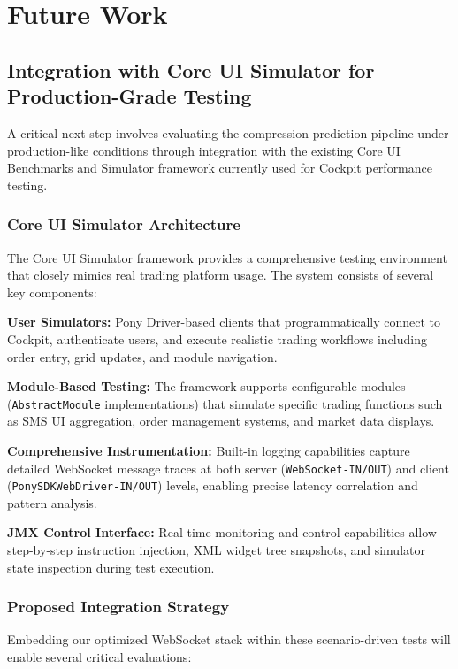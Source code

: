 \documentclass[12pt,a4paper]{article}
\begin{document}
\section{Future Work}

\subsection{Integration with Core UI Simulator for Production-Grade Testing}

A critical next step involves evaluating the compression-prediction pipeline under production-like conditions through integration with the existing Core UI Benchmarks and Simulator framework currently used for Cockpit performance testing.

\subsubsection{Core UI Simulator Architecture}

The Core UI Simulator framework provides a comprehensive testing environment that closely mimics real trading platform usage. The system consists of several key components:

\textbf{User Simulators:} Pony Driver-based clients that programmatically connect to Cockpit, authenticate users, and execute realistic trading workflows including order entry, grid updates, and module navigation.

\textbf{Module-Based Testing:} The framework supports configurable modules (\texttt{AbstractModule} implementations) that simulate specific trading functions such as SMS UI aggregation, order management systems, and market data displays.

\textbf{Comprehensive Instrumentation:} Built-in logging capabilities capture detailed WebSocket message traces at both server (\texttt{WebSocket-IN/OUT}) and client (\texttt{PonySDKWebDriver-IN/OUT}) levels, enabling precise latency correlation and pattern analysis.

\textbf{JMX Control Interface:} Real-time monitoring and control capabilities allow step-by-step instruction injection, XML widget tree snapshots, and simulator state inspection during test execution.

\subsubsection{Proposed Integration Strategy}

Embedding our optimized WebSocket stack within these scenario-driven tests will enable several critical evaluations:
\end{document}
